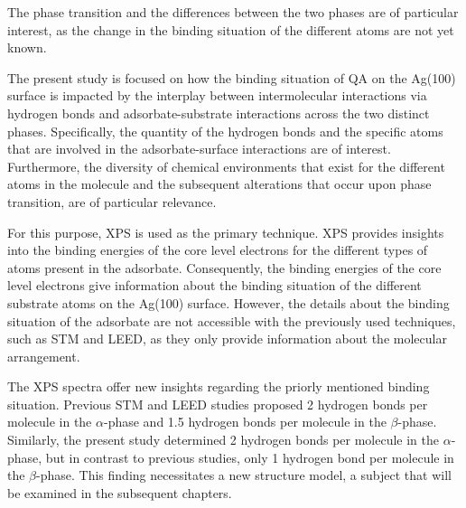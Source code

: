 The phase transition and the differences between the two phases are of particular interest, as the change in the binding situation of the different atoms are not yet known.

The present study is focused on how the binding situation of \ac{QA} on the Ag(100) surface is impacted by the interplay between intermolecular interactions via hydrogen bonds and adsorbate-substrate interactions across the two distinct phases. Specifically, the quantity of the hydrogen bonds and the specific atoms that are involved in the adsorbate-surface interactions are of interest. Furthermore, the diversity of chemical environments that exist for the different atoms in the molecule and the subsequent alterations that occur upon phase transition, are of particular relevance.

For this purpose, \ac{XPS} is used as the primary technique. \Ac{XPS} provides insights into the binding energies of the core level electrons for the different types of atoms present in the adsorbate. Consequently, the binding energies of the core level electrons give information about the binding situation of the different substrate atoms on the Ag(100) surface. However, the details about the binding situation of the adsorbate are not accessible with the previously used techniques, such as \ac{STM} and \ac{LEED}, as they only provide information about the molecular arrangement.

The \ac{XPS} spectra offer new insights regarding the priorly mentioned binding situation. Previous \ac{STM} and \ac{LEED} studies proposed 2 hydrogen bonds per molecule in the $\alpha$-phase and 1.5 hydrogen bonds per molecule in the $\beta$-phase.\autocite{Humberg2024, Humberg2020} Similarly, the present study determined 2 hydrogen bonds per molecule in the $\alpha$-phase, but in contrast to previous studies, only 1 hydrogen bond per molecule in the $\beta$-phase. This finding necessitates a new structure model, a subject that will be examined in the subsequent chapters.

\cleardoublepage